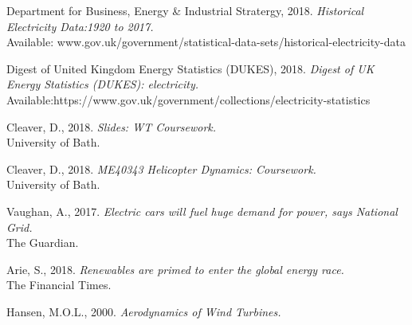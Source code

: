 \documentclass[11pt]{article}
\begin{document}
\begin{thebibliography}{9}

Department for Business, Energy \& Industrial Stratergy, 2018. 
\textit{Historical Electricity Data:1920 to 2017.}\\
Available: www.gov.uk/government/statistical-data-sets/historical-electricity-data

Digest of United Kingdom Energy Statistics (DUKES), 2018. 
\textit{Digest of UK Energy Statistics (DUKES): electricity.}
Available:https://www.gov.uk/government/collections/electricity-statistics

Cleaver, D., 2018. 
\textit{Slides: WT Coursework.}\\
University of Bath.

Cleaver, D., 2018. 
\textit{ME40343 Helicopter Dynamics: Coursework.}\\
University of Bath.

Vaughan, A., 2017. 
\textit{Electric cars will fuel huge demand for power, says National Grid.}\\
The Guardian.

Arie, S., 2018. 
\textit{Renewables are primed to enter the global energy race.}\\
The Financial Times.

Hansen, M.O.L., 2000. 
\textit{Aerodynamics of Wind Turbines.}\\

\end{thebibliography}


\pagebreak
\end{document}
